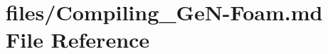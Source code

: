 \hypertarget{Compiling__GeN-Foam_8md}{}\section{files/\+Compiling\+\_\+\+Ge\+N-\/\+Foam.md File Reference}
\label{Compiling__GeN-Foam_8md}

